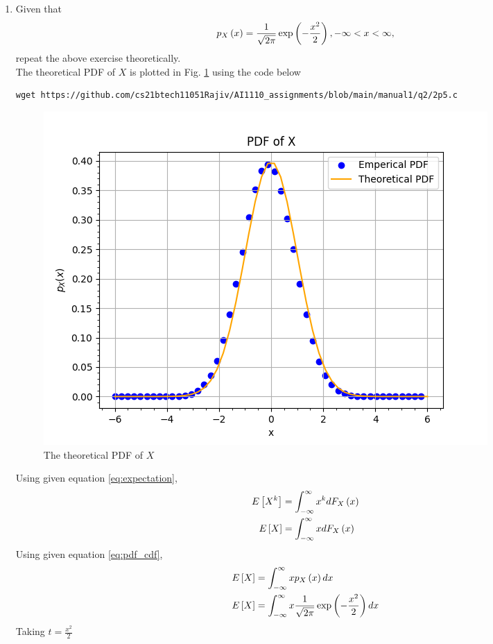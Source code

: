 \documentclass[journal,12pt,twocolumn]{IEEEtran}
\renewcommand\thesection{\arabic{section}}
\begin{document}
\begin{enumerate}[label=\thesection.\arabic*
,ref=\thesection.\theenumi]
\begin{align}
\text{var}\sbrak{X}  = 0.999560
\end{align}
%
\item Given that 
\begin{align}
p_{X}\left(x\right) = \frac{1}{\sqrt{2\pi}}\exp\left(-\frac{x^2}{2}\right), -\infty < x < \infty,
\end{align}
repeat the above exercise theoretically.
\\
\solution The theoretical PDF of $X$ is plotted in Fig. \ref{fig:theory_gauss_pdf} using the code below
\begin{lstlisting}
wget https://github.com/cs21btech11051Rajiv/AI1110_assignments/blob/main/manual1/q2/2p5.c
\end{lstlisting}
\begin{figure}[ht!]
\centering
\includegraphics[width=\columnwidth]{./figs/fig2.5.png}
\caption{The theoretical PDF of $X$}
\label{fig:theory_gauss_pdf}
\end{figure}
Using given equation \eqref{eq:expectation},
\begin{align}
    E{}\left[X^k\right] &= \int_{-\infty}^{\infty}x^kdF_{X}\left(x\right) \\
    E{}\left[X\right] &= \int_{-\infty}^{\infty}x dF_{X}\left(x\right) 
\end{align}
Using given equation \eqref{eq:pdf_cdf},
\begin{align}
    E{}\left[X\right] &= \int_{-\infty}^{\infty}x p_{X}\left(x\right) dx \\
    E{}\left[X\right] &= \int_{-\infty}^{\infty}x
    \frac{1}{\sqrt{2\pi}}\exp\left(-\frac{x^2}{2}\right) dx    
\end{align}
Taking $t = \frac{x^2}{2}$

\end{enumerate}
\end{document}
